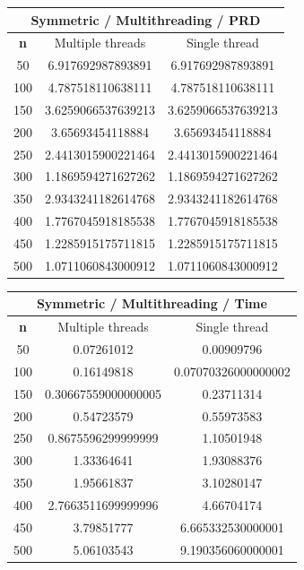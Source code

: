 \documentclass{article}
\begin{document}
\begin{center}
\begin{tabular}{|c|c|c|}
\hline
\multicolumn{3}{|c|}{\textbf{Symmetric / Multithreading / PRD}}\\
\hline
\textbf{n} & Multiple threads & Single thread\\
\hline
50 & 6.917692987893891 & 6.917692987893891\\
\hline
100 & 4.787518110638111 & 4.787518110638111\\
\hline
150 & 3.6259066537639213 & 3.6259066537639213\\
\hline
200 & 3.65693454118884 & 3.65693454118884\\
\hline
250 & 2.4413015900221464 & 2.4413015900221464\\
\hline
300 & 1.1869594271627262 & 1.1869594271627262\\
\hline
350 & 2.9343241182614768 & 2.9343241182614768\\
\hline
400 & 1.7767045918185538 & 1.7767045918185538\\
\hline
450 & 1.2285915175711815 & 1.2285915175711815\\
\hline
500 & 1.0711060843000912 & 1.0711060843000912\\
\hline
\end{tabular}
\end{center}


\begin{center}
\begin{tabular}{|c|c|c|}
\hline
\multicolumn{3}{|c|}{\textbf{Symmetric / Multithreading / Time}}\\
\hline
\textbf{n} & Multiple threads & Single thread\\
\hline
50 & 0.07261012 & 0.00909796\\
\hline
100 & 0.16149818 & 0.07070326000000002\\
\hline
150 & 0.30667559000000005 & 0.23711314\\
\hline
200 & 0.54723579 & 0.55973583\\
\hline
250 & 0.8675596299999999 & 1.10501948\\
\hline
300 & 1.33364641 & 1.93088376\\
\hline
350 & 1.95661837 & 3.10280147\\
\hline
400 & 2.7663511699999996 & 4.66704174\\
\hline
450 & 3.79851777 & 6.665332530000001\\
\hline
500 & 5.06103543 & 9.190356060000001\\
\hline
\end{tabular}
\end{center}
\end{document}
